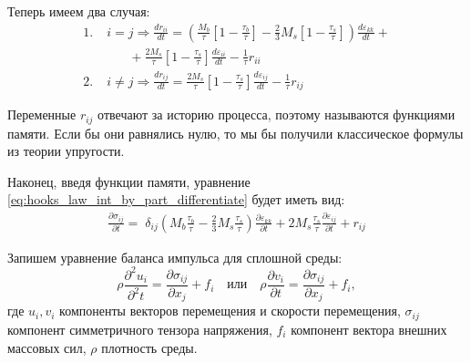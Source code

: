 \documentclass[a4paper, fontsize=14pt]{article}
\begin{document}
Теперь имеем два случая:
\begin{equation}
    \label{eq:brain_funct}
    \begin{aligned}
        1.& \; i = j \Rightarrow \frac{dr_{ii}}{dt} =    \left(\frac{M_b}{\tau} \left[1 - \frac{\tau_b}{\tau} \right] - \frac{2}{3} M_s \left[1 - \frac{\tau_s}{\tau}\right] \right) \frac{d \varepsilon_{kk}}{dt} + \\
        &\qquad +\frac{2 M_s}{\tau} \left[1 - \frac{\tau_s}{\tau} \right] \frac{d \varepsilon_{ii}}{dt} - \frac{1}{\tau} r_{ii} \\
        2.& \; i \neq j \Rightarrow \frac{dr_{ij}}{dt} = \frac{2 M_s}{\tau} \left[1 - \frac{\tau_s}{\tau} \right] \frac{d \varepsilon_{ij}}{dt} - \frac{1}{\tau} r_{ij} 
    \end{aligned}
\end{equation}

Переменные $r_{ij}$ отвечают за историю процесса, поэтому называются функциями памяти. Если бы они равнялись нулю, то мы бы получили классическое формулы из теории упругости.

Наконец, введя функции памяти, уравнение \eqref{eq:hooks_law_int_by_part_differentiate} будет иметь вид:
\begin{equation}
    \label{eq:hooks_law_final}
    \begin{aligned}
        \frac{\partial \sigma_{ij}}{\partial t}  = \; \delta_{ij} \left( M_b\frac{\tau_b}{\tau} - \frac{2}{3} M_s \frac{\tau_s}{\tau} \right)  \frac{\partial \varepsilon_{kk}}{\partial t} + 2 M_s \frac{\tau_s}{\tau} \frac{\partial \varepsilon_{ij}}{\partial t} + r_{ij}
    \end{aligned}
\end{equation}

Запишем уравнение баланса импульса для сплошной среды: 
\begin{equation}
    \label{eq:newton_law}
    \rho \frac{\partial^2 u_{i}}{\partial^2 t} = \frac{\partial \sigma_{ij}}{\partial x_j}  + f_{i} \quad \text{или} \quad \rho \frac{\partial v_{i}}{\partial t}  = \frac{\partial \sigma_{ij}}{\partial x_j}  + f_{i},
\end{equation}
где $u_{i}, v_{i}$ компоненты векторов перемещения и скорости перемещения, $\sigma_{ij}$ компонент симметричного тензора напряжения, $f_i$ компонент вектора внешних массовых сил, $\rho$ плотность среды.
\end{document}
